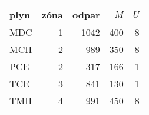\begin{tabular}{lrrrr}
\toprule
plyn & zóna &  odpar &  $M$ &  $U$ \\
\midrule
 MDC & 1&   1042 &  400 &    8 \\
 MCH &2&    989 &  350 &    8 \\
 PCE &2&    317 &  166 &    1 \\
 TCE &3&    841 &  130 &    1 \\
 TMH &4&    991 &  450 &    8 \\
\bottomrule
\end{tabular}
